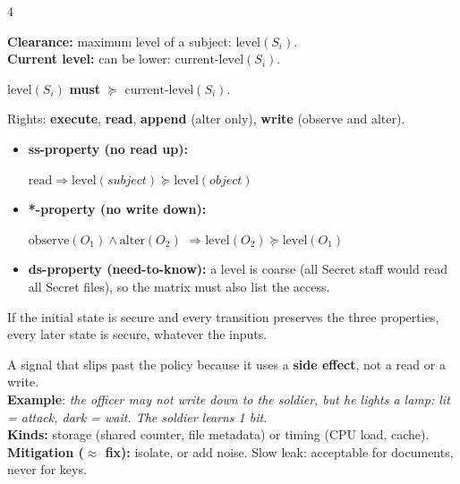 \documentclass[8pt,a4paper,landscape]{extarticle}
\begin{document}
\begin{multicols*}{4}
\begin{defn}[title=Clearance (subjects)]
    \textbf{Clearance:} maximum level of a subject: $\text{level}(S_i)$.\\
    \textbf{Current level:} can be lower: $\text{current-level}(S_i)$.
    \par{\centering $\text{level}(S_i)$ \textbf{must} $\succeq$ $\text{current-level}(S_i)$. \par}
\end{defn}

\begin{prop}[title=Model 1 - Bell-La Padula (BLP): confidentiality]
    Rights: \textbf{execute}, \textbf{read}, \textbf{append} (alter only), \textbf{write} (observe and alter).
\end{prop}

\begin{thm}[title=BLP properties]
    \begin{itemize}
        \item \textbf{ss-property (no read up):}
            \par{\centering $\text{read} \Rightarrow \text{level}(subject) \succeq \text{level}(object)$ \par}
        \item \textbf{*-property (no write down):}
            \par{\centering $\text{observe}(O_1) \wedge \text{alter}(O_2)$ $\Rightarrow \text{level}(O_2) \succeq \text{level}(O_1)$ \par}
        \item \textbf{ds-property (need-to-know):} a level is coarse (all Secret staff would read all Secret files), so the matrix must also list the access.
    \end{itemize}
\end{thm}

\begin{defn}[title=Basic Security Theorem]
    If the initial state is secure and every transition preserves the three properties, every later state is secure, whatever the inputs.
\end{defn}

\begin{atk}[title=Covert channel]
    A signal that slips past the policy because it uses a \textbf{side effect}, not a read or a write.\\
    \textbf{Example}: \textit{the officer may not write down to the soldier, but he lights a lamp: lit = attack, dark = wait. The soldier learns 1 bit.}\\
    \textbf{Kinds:} storage (shared counter, file metadata) or timing (CPU load, cache).\\
    \textbf{Mitigation ($\approx$ fix):} isolate, or add noise. Slow leak: acceptable for documents, never for keys.
\end{atk}


\end{multicols*}
\end{document}
